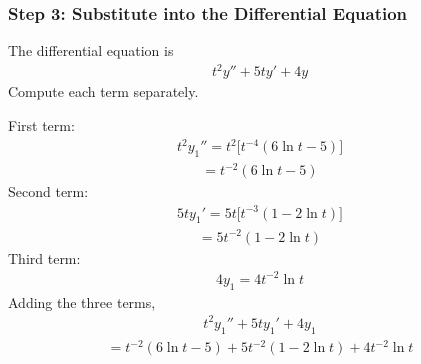 \documentclass[letterpaper,10pt,english]{sphinxmanual}
\begin{document}
\subsubsection{Step 3: Substitute into the Differential Equation}
\label{\detokenize{Language/Science_language/ODE_calculus/course_MATH_3035/homework_assignments/index_pdf:step-3-substitute-into-the-differential-equation}}
\sphinxAtStartPar
The differential equation is
\begin{equation*}
\begin{split}t^2y''+5ty'+4y\end{split}
\end{equation*}
\sphinxAtStartPar
Compute each term separately.

\sphinxAtStartPar
First term:
\begin{equation*}
\begin{split}t^2y_1''
=
t^2\Big[t^{-4}(6\ln t-5)\Big]\end{split}
\end{equation*}\begin{equation*}
\begin{split}=
t^{-2}(6\ln t-5)\end{split}
\end{equation*}
\sphinxAtStartPar
Second term:
\begin{equation*}
\begin{split}5ty_1'
=
5t\Big[t^{-3}(1-2\ln t)\Big]\end{split}
\end{equation*}\begin{equation*}
\begin{split}=
5t^{-2}(1-2\ln t)\end{split}
\end{equation*}
\sphinxAtStartPar
Third term:
\begin{equation*}
\begin{split}4y_1
=
4t^{-2}\ln t\end{split}
\end{equation*}
\sphinxAtStartPar
Adding the three terms,
\begin{equation*}
\begin{split}t^2y_1''+5ty_1'+4y_1\end{split}
\end{equation*}\begin{equation*}
\begin{split}=
t^{-2}(6\ln t-5)
+
5t^{-2}(1-2\ln t)
+
4t^{-2}\ln t\end{split}
\end{equation*}
\end{document}
